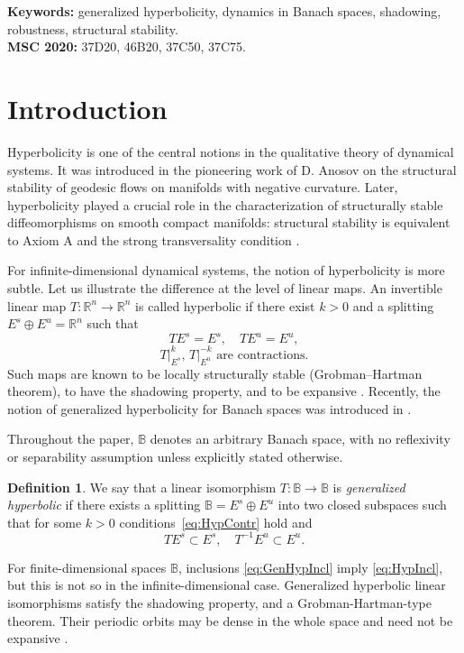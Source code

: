 \documentclass[12pt]{article}
\newcommand{\Bb}{\mathbb{B}}
\newcommand{\Rr}{\mathbb{R}}
\theoremstyle{definition}
\newtheorem{defin}[thm]{Definition}
\begin{document}
\noindent\textbf{Keywords:} generalized hyperbolicity, dynamics in Banach spaces, shadowing, robustness, structural stability.\\
\textbf{MSC 2020: }{37D20, 46B20, 37C50, 37C75.}


\section{Introduction}

Hyperbolicity is one of the central notions in the qualitative theory of dynamical systems. It was introduced in the pioneering work of D. Anosov \cite{Anosov} on the structural stability of geodesic flows on manifolds with negative curvature. 
Later, hyperbolicity played a crucial role in the characterization of structurally stable diffeomorphisms on smooth compact manifolds: structural stability is equivalent to Axiom A and the strong transversality condition \cite{Mane1982, Mane1987, Rob71, Robinson1976}. 

For infinite-dimensional dynamical systems, the notion of hyperbolicity is more subtle. Let us illustrate the difference at the level of linear maps. An invertible linear map $T: \Rr^n \to \Rr^n$ is called hyperbolic if there exist $k > 0$ and a splitting $E^s \oplus E^u = \Rr^n$ such that
\begin{equation}\label{eq:HypIncl}
    T E^s = E^s, \quad T E^u = E^u,
\end{equation}
\begin{equation}\label{eq:HypContr}
    \mbox{$T|^k_{E^s}$, $T|^{-k}_{E^u}$ are contractions}.
\end{equation}
Such maps are known to be locally structurally stable (Grobman–Hartman theorem), to have the shadowing property, and to be expansive \cite{KatokHas}. 
Recently, the notion of generalized hyperbolicity for Banach spaces was introduced in \cite{Puj18, Puj21}. 

Throughout the paper, $\Bb$ denotes an arbitrary Banach space, with no reflexivity or separability assumption unless explicitly stated
otherwise.
\begin{defin}\label{def:genhyp}
We say that a linear isomorphism $T:\Bb\to\Bb$ is \textit{generalized hyperbolic} if there exists a splitting $\Bb = E^s \oplus E^u$ into two closed subspaces such that for some $k>0$ conditions~\eqref{eq:HypContr} hold and
\begin{equation}\label{eq:GenHypIncl}
    T E^s \subset E^s, \quad T^{-1} E^u \subset E^u.
\end{equation}
\end{defin}
For finite-dimensional spaces $\Bb$, inclusions \eqref{eq:GenHypIncl} imply \eqref{eq:HypIncl}, but this is not so in the infinite-dimensional case. Generalized hyperbolic linear isomorphisms satisfy the shadowing property, and a Grobman-Hartman-type theorem. Their periodic orbits may be dense in the whole space and need not be expansive \cite{Puj18, Puj21, NilsonAli, Bernardes2026}.
\end{document}
